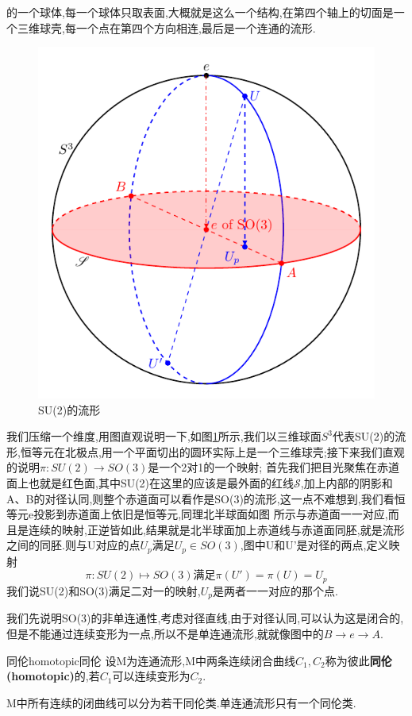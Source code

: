 \documentclass[../main.tex]{subfiles}
\begin{document}
 的一个球体,每一个球体只取表面,大概就是这么一个结构,在第四个轴上的切面是一个三维球壳,每一个点在第四个方向相连,最后是一个连通的流形.
 \begin{figure}[htbp]
     \centering
     \includegraphics{../tikzpicture/SU2.pdf}
     \caption{SU(2)的流形}
     \label{SU(2)的流形图}
 \end{figure}
 我们压缩一个维度,用图直观说明一下,如图\ref{SU(2)的流形图}所示,我们以三维球面$S^3$代表SU(2)的流形,恒等元在北极点,用一个平面切出的圆环实际上是一个三维球壳;接下来我们直观的说明$\pi:SU(2)\rightarrow SO(3)$是一个2对1的一个映射;
 首先我们把目光聚焦在赤道面上也就是红色面,其中SU(2)在这里的应该是最外面的红线$\mathscr{S}$,加上内部的阴影和A、B的对径认同,则整个赤道面可以看作是SO(3)的流形,这一点不难想到,我们看恒等元e投影到赤道面上依旧是恒等元,同理北半球面如图
 所示与赤道面一一对应,而且是连续的映射,正逆皆如此,结果就是北半球面加上赤道线与赤道面同胚,就是流形之间的同胚.则与U对应的点$U_p$满足$U_p \in SO(3)$,图中U和U'是对径的两点,定义映射$$\pi:SU(2) \mapsto SO(3)\text{满足} \pi(U') = \pi(U) = U_p$$
 我们说SU(2)和SO(3)满足二对一的映射,$U_p$是两者一一对应的那个点.

 我们先说明SO(3)的非单连通性,考虑对径直线,由于对径认同,可以认为这是闭合的,但是不能通过连续变形为一点,所以不是单连通流形,就就像图中的$B\rightarrow e \rightarrow A$.
 \begin{definition}{同伦homotopic}{同伦}
     设M为连通流形,M中两条连续闭合曲线$C_1,C_2$称为彼此\textbf{同伦(homotopic)}的,若$C_1$可以连续变形为$C_2$.
 \end{definition}
 M中所有连续的闭曲线可以分为若干同伦类.单连通流形只有一个同伦类.
\end{document}
